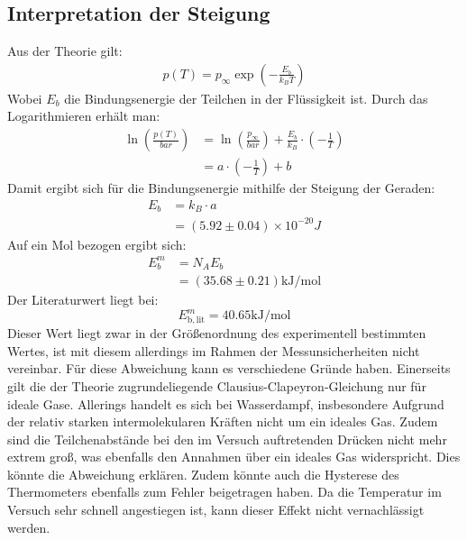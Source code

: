 \documentclass{report}
\begin{document}
\subsection{Interpretation der Steigung}
Aus der Theorie gilt:
\begin{equation}
    \begin{split}
        p(T) = p_{\infty} \exp\left(-\frac{E_b}{k_B T}\right)
    \end{split}
\end{equation}
Wobei $E_b$ die Bindungsenergie der Teilchen in der Flüssigkeit ist.
Durch das Logarithmieren erhält man:
\begin{equation}
    \begin{split}
        \ln\left(\frac{p(T)}{\si{bar}}\right)   &= \ln \left(\frac{p_{\infty}}{\si{bar}}\right) + \frac{E_b}{k_B} \cdot \left(-\frac{1}{T}\right) \\
                                                &= a \cdot \left(-\frac{1}{T}\right) + b
    \end{split}
\end{equation}
Damit ergibt sich für die Bindungsenergie mithilfe der Steigung der Geraden:
\begin{equation}
    \begin{split}
        E_b &= k_B \cdot a \\
            &= (5.92 \pm 0.04) \times 10^{-20} \si{J}
    \end{split}
\end{equation}
Auf ein Mol bezogen ergibt sich:
\begin{equation}
    \begin{split}
        E_b^m   &= N_A E_b \\
                &= (35.68 \pm 0.21) \si{\kilo\joule \per \mol}
    \end{split}
\end{equation}  
Der Literaturwert liegt bei:
\begin{equation}
    E_{\mathrm{b, lit}}^m = 40.65 \si{\kilo\joule \per \mol}
\end{equation}
Dieser Wert liegt zwar in der Größenordnung des experimentell bestimmten Wertes, ist mit diesem allerdings im Rahmen der Messunsicherheiten nicht vereinbar.
Für diese Abweichung kann es verschiedene Gründe haben. 
Einerseits gilt die der Theorie zugrundeliegende Clausius-Clapeyron-Gleichung nur für ideale Gase. Allerings handelt es sich bei Wasserdampf, insbesondere 
Aufgrund der relativ starken intermolekularen Kräften nicht um ein ideales Gas. Zudem sind die Teilchenabstände bei den im Versuch auftretenden 
Drücken nicht mehr extrem groß, was ebenfalls den Annahmen über ein ideales Gas widerspricht. Dies könnte die Abweichung erklären. 
Zudem könnte auch die Hysterese des Thermometers ebenfalls zum Fehler beigetragen haben. Da die Temperatur im Versuch sehr schnell angestiegen ist, kann dieser Effekt 
nicht vernachlässigt werden.
\end{document}
